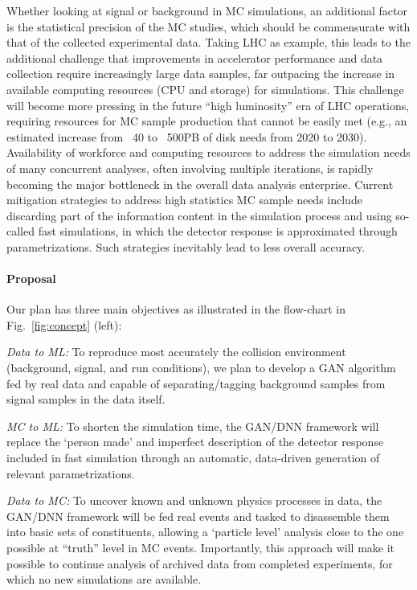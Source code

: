 Whether looking at signal or background in MC simulations, an additional factor is the statistical precision of the MC studies, which should be commensurate with that of the collected experimental data. Taking LHC as example, this leads to the additional challenge that improvements in accelerator performance and data collection require increasingly large data samples, far outpacing the increase in available computing resources (CPU and storage) for simulations. This challenge will become more pressing in the future ``high luminosity'' era of LHC operations, requiring resources for MC sample production that cannot be easily met (e.g., an estimated increase from ~40 to ~500PB of disk needs from 2020 to 2030). Availability of workforce and computing resources to address the simulation needs of many concurrent analyses, often involving multiple iterations, is rapidly becoming the major bottleneck in the overall data analysis enterprise. Current mitigation strategies to address high statistics MC sample needs include discarding part of the information content in the simulation process and using so-called fast simulations, in which the detector response is approximated through parametrizations. Such  strategies inevitably lead to less overall accuracy. 
\vspace{-0.5cm}
\paragraph{Proposal} Our plan has three main objectives as illustrated in the flow-chart in Fig.~\ref{fig:concept} (left):

\textit{Data to ML:} To reproduce most accurately the collision environment (background, signal, and run conditions), we plan to develop a GAN algorithm fed by real data and capable of separating/tagging background samples from signal samples in the data itself.

\textit{MC to ML:} To shorten the simulation time, the GAN/DNN framework will replace the `person made' and imperfect description of the detector response included in fast simulation through an automatic, data-driven generation of relevant parametrizations.

\textit{Data to MC:} To uncover known and unknown physics processes in data, the GAN/DNN framework will be fed real events and tasked to disassemble them into basic sets of constituents, allowing a `particle level' analysis close to the one possible at ``truth'' level in MC events. Importantly, this approach will make it possible to continue analysis of archived data  from completed experiments, for which no new simulations are available.

